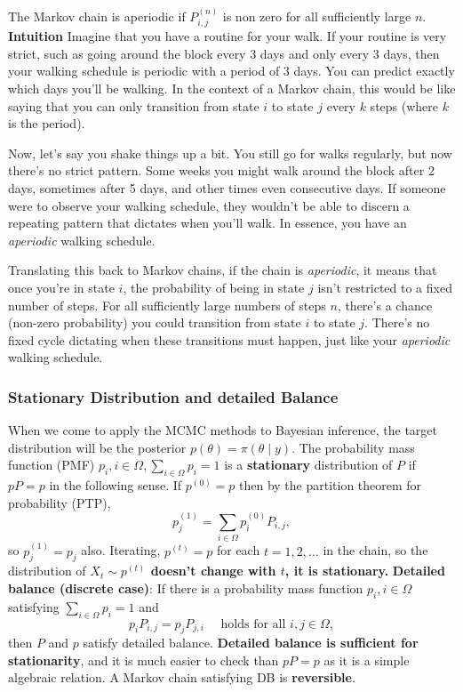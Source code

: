 \documentclass[10pt]{article}
\begin{document}
The Markov chain is aperiodic if $P_{i, j}^{(n)}$ is non zero for all sufficiently large $n$.
\newline
\textbf{Intuition} \newline
Imagine that you have a routine for your walk. If your routine is very strict, such as going around the block every 3 days and only every 3 days, then your walking schedule is periodic with a period of 3 days. You can predict exactly which days you'll be walking. In the context of a Markov chain, this would be like saying that you can only transition from state \( i \) to state \( j \) every \( k \) steps (where \( k \) is the period).

Now, let's say you shake things up a bit. You still go for walks regularly, but now there's no strict pattern. Some weeks you might walk around the block after 2 days, sometimes after 5 days, and other times even consecutive days. If someone were to observe your walking schedule, they wouldn't be able to discern a repeating pattern that dictates when you'll walk. In essence, you have an \textit{aperiodic} walking schedule.

Translating this back to Markov chains, if the chain is \textit{aperiodic}, it means that once you're in state \( i \), the probability of being in state \( j \) isn't restricted to a fixed number of steps. For all sufficiently large numbers of steps \( n \), there's a chance (non-zero probability) you could transition from state \( i \) to state \( j \). There's no fixed cycle dictating when these transitions must happen, just like your \textit{aperiodic} walking schedule.

\subsubsection{Stationary Distribution and detailed Balance}
When we come to apply the MCMC methods to Bayesian inference, the target distribution will be the posterior $p(\theta)=\pi(\theta \mid y)$.
The probability mass function (PMF) $p_i, i \in \Omega, \sum_{i \in \Omega} p_i=1$ is a \textbf{stationary} distribution of $P$ if $p P=p$ in the following sense. If $p^{(0)}=p$ then by the partition theorem for probability (PTP),
$$
p_j^{(1)}=\sum_{i \in \Omega} p_i^{(0)} P_{i, j},
$$
so $p_j^{(1)}=p_j$ also. Iterating, $p^{(t)}=p$ for each $t=1,2, \ldots$ in the chain, so the distribution of \textbf{$X_t \sim p^{(t)}$ doesn't change with $t$, it is stationary.}
\newline
\textbf{Detailed balance (discrete case)}: If there is a probability mass function $p_i, i \in \Omega$ satisfying $\sum_{i \in \Omega} p_i=1$ and
$$
p_i P_{i, j}=p_j P_{j, i} \quad \text { holds for all } i, j \in \Omega,
$$
then $P$ and $p$ satisfy detailed balance.
\newline
\newline
\textbf{Detailed balance is sufficient for stationarity}, and it is much easier to check than $p P=p$ as it is a simple algebraic relation. A Markov chain satisfying DB is \textbf{reversible}.
\end{document}
